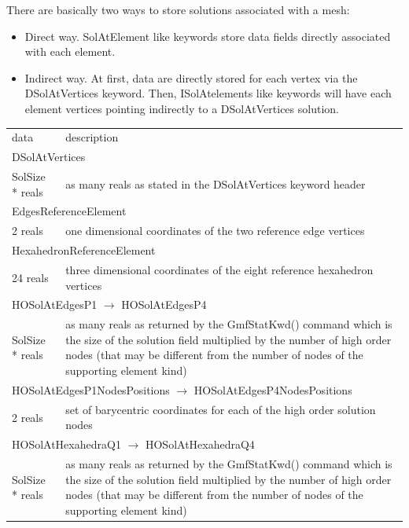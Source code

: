 \documentclass[a4paper,12pt]{article}
\begin{document}
There are basically two ways to store solutions associated with a mesh:

\begin{itemize}
\item Direct way. SolAtElement like keywords store data fields directly associated with each element.
\item Indirect way. At first, data are directly stored for each vertex via the DSolAtVertices keyword. Then, ISolAtelements like keywords will have each element vertices pointing indirectly to a DSolAtVertices solution.
\end{itemize}

\setlongtables
\begin{longtable}{|m{4cm}|m{11cm}|}
\endhead
\endfoot

\hline
\multicolumn{2}{|l|}{keyword} \\
\hline
data & description \\
\hline\hline

\multicolumn{2}{|l|}{DSolAtVertices} \\
\hline
SolSize * reals & as many reals as stated in the DSolAtVertices keyword header \\
\hline\hline

\multicolumn{2}{|l|}{EdgesReferenceElement} \\
\hline
2 reals & one dimensional coordinates of the two reference edge vertices \\
\hline\hline

\multicolumn{2}{|l|}{HexahedronReferenceElement} \\
\hline
24 reals & three dimensional coordinates of the eight reference hexahedron vertices \\
\hline\hline

\multicolumn{2}{|l|}{HOSolAtEdgesP1 $\rightarrow$ HOSolAtEdgesP4} \\
\hline
SolSize * reals & as many reals as returned by the GmfStatKwd() command which is the size of the solution field multiplied by the number of high order nodes (that may be different from the number of nodes of the supporting element kind)\\
\hline\hline

\multicolumn{2}{|l|}{HOSolAtEdgesP1NodesPositions $\rightarrow$ HOSolAtEdgesP4NodesPositions} \\
\hline
2 reals & set of barycentric coordinates for each of the high order solution nodes \\
\hline\hline

\multicolumn{2}{|l|}{HOSolAtHexahedraQ1 $\rightarrow$ HOSolAtHexahedraQ4} \\
\hline
SolSize * reals & as many reals as returned by the GmfStatKwd() command which is the size of the solution field multiplied by the number of high order nodes (that may be different from the number of nodes of the supporting element kind)\\
\hline\hline


\end{longtable}
\end{document}
